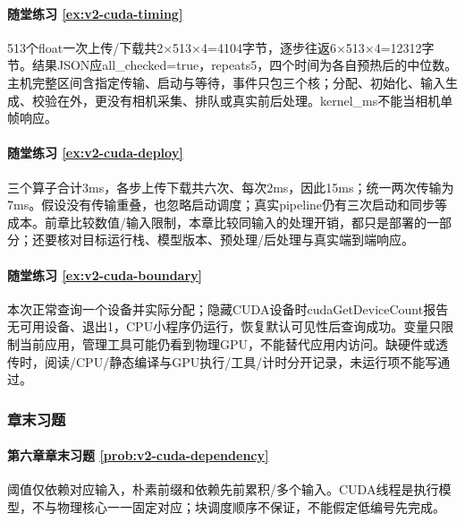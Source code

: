 \paragraph*{随堂练习 \ref{ex:v2-cuda-timing}}
\begin{solution}
513个float一次上传/下载共2×513×4=4104字节，逐步往返6×513×4=12312字节。结果JSON应all\_checked=true，repeats5，四个时间为各自预热后的中位数。主机完整区间含指定传输、启动与等待，事件只包三个核；分配、初始化、输入生成、校验在外，更没有相机采集、排队或真实前后处理。kernel\_ms不能当相机单帧响应。
\end{solution}

\paragraph*{随堂练习 \ref{ex:v2-cuda-deploy}}
\begin{solution}
三个算子合计3ms，各步上传下载共六次、每次2ms，因此15ms；统一两次传输为7ms。假设没有传输重叠，也忽略启动调度；真实pipeline仍有三次启动和同步等成本。前章比较数值/输入限制，本章比较同输入的处理开销，都只是部署的一部分；还要核对目标运行栈、模型版本、预处理/后处理与真实端到端响应。
\end{solution}

\paragraph*{随堂练习 \ref{ex:v2-cuda-boundary}}
\begin{solution}
本次正常查询一个设备并实际分配；隐藏CUDA设备时cudaGetDeviceCount报告无可用设备、退出1，CPU小程序仍运行，恢复默认可见性后查询成功。变量只限制当前应用，管理工具可能仍看到物理GPU，不能替代应用内访问。缺硬件或透传时，阅读/CPU/静态编译与GPU执行/工具/计时分开记录，未运行项不能写通过。
\end{solution}

\subsubsection*{章末习题}
\paragraph*{第六章章末习题 \ref{prob:v2-cuda-dependency}}
\begin{solution}
阈值仅依赖对应输入，朴素前缀和依赖先前累积/多个输入。CUDA线程是执行模型，不与物理核心一一固定对应；块调度顺序不保证，不能假定低编号先完成。
\end{solution}


